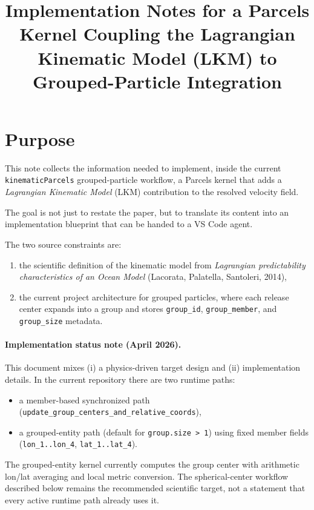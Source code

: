 \documentclass[11pt,a4paper]{article}
\title{Implementation Notes for a Parcels Kernel Coupling the Lagrangian Kinematic Model (LKM) to Grouped-Particle Integration}
\author{}
\date{}
\begin{document}
	\maketitle
	
	\section{Purpose}
	
	This note collects the information needed to implement, inside the current \texttt{kinematicParcels} grouped-particle workflow, a Parcels kernel that adds a \emph{Lagrangian Kinematic Model} (LKM) contribution to the resolved velocity field.
	
	The goal is not just to restate the paper, but to translate its content into an implementation blueprint that can be handed to a VS Code agent.
	
	The two source constraints are:
	\begin{enumerate}[label=\arabic*.]
		\item the scientific definition of the kinematic model from \emph{Lagrangian predictability characteristics of an Ocean Model} (Lacorata, Palatella, Santoleri, 2014),
		\item the current project architecture for grouped particles, where each release center expands into a group and stores \texttt{group\_id}, \texttt{group\_member}, and \texttt{group\_size} metadata.
	\end{enumerate}

	\paragraph{Implementation status note (April 2026).}
	This document mixes (i) a physics-driven target design and (ii) implementation details.
	In the current repository there are two runtime paths:
	\begin{itemize}
		\item a member-based synchronized path (\texttt{update\_group\_centers\_and\_relative\_coords}),
		\item a grouped-entity path (default for \texttt{group.size > 1}) using fixed member fields (\texttt{lon\_1..lon\_4}, \texttt{lat\_1..lat\_4}).
	\end{itemize}
	The grouped-entity kernel currently computes the group center with arithmetic lon/lat averaging and local metric conversion.
	The spherical-center workflow described below remains the recommended scientific target, not a statement that every active runtime path already uses it.
	
\end{document}
